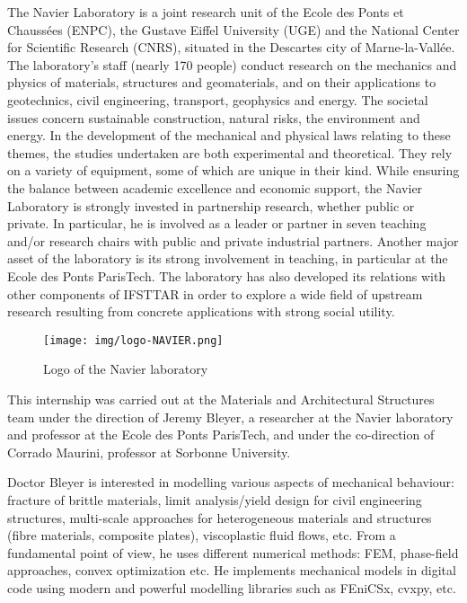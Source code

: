 \documentclass[12pt]{article}
\begin{document}
The Navier Laboratory is a joint research unit of the Ecole des Ponts et Chaussées (ENPC), the Gustave Eiffel University (UGE) and the National Center for Scientific Research (CNRS), situated in the Descartes city of Marne-la-Vallée. The laboratory's staff (nearly 170 people) conduct research on the mechanics and physics of materials, structures and geomaterials, and on their applications to geotechnics, civil engineering, transport, geophysics and energy. The societal issues concern sustainable construction, natural risks, the environment and energy. In the development of the mechanical and physical laws relating to these themes, the studies undertaken are both experimental and theoretical. They rely on a variety of equipment, some of which are unique in their kind. While ensuring the balance between academic excellence and economic support, the Navier Laboratory is strongly invested in partnership research, whether public or private. In particular, he is involved as a leader or partner in seven teaching and/or research chairs with public and private industrial partners. Another major asset of the laboratory is its strong involvement in teaching, in particular at the Ecole des Ponts ParisTech. The laboratory has also developed its relations with other components of IFSTTAR in order to explore a wide field of upstream research resulting from concrete applications with strong social utility.

\begin{figure}[H]
    \centering
    \texttt{[image: img/logo-NAVIER.png]}
    \caption{Logo of the Navier laboratory}
\end{figure}

This internship was carried out at the Materials and Architectural Structures team under the direction of Jeremy Bleyer, a researcher at the Navier laboratory and professor at the Ecole des Ponts ParisTech, and under the co-direction of Corrado Maurini, professor at Sorbonne University.
 
Doctor Bleyer is interested in modelling various aspects of mechanical behaviour: fracture of brittle materials, limit analysis/yield design for civil engineering structures, multi-scale approaches for heterogeneous materials and structures (fibre materials, composite plates), viscoplastic fluid flows, etc. From a fundamental point of view, he uses different numerical methods: FEM, phase-field approaches, convex optimization etc. He implements mechanical models in digital code using modern and powerful modelling libraries such as FEniCSx, cvxpy, etc. 
 
\end{document}

